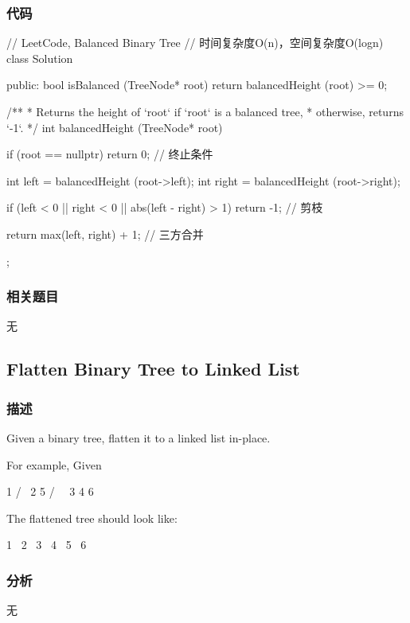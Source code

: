 \subsubsection{代码}
\begin{Code}
// LeetCode, Balanced Binary Tree
// 时间复杂度O(n)，空间复杂度O(logn)
class Solution {
public:
    bool isBalanced (TreeNode* root) {
        return balancedHeight (root) >= 0;
    }

    /**
     * Returns the height of `root` if `root` is a balanced tree,
     * otherwise, returns `-1`.
     */
    int balancedHeight (TreeNode* root) {
        if (root == nullptr) return 0;  // 终止条件

        int left = balancedHeight (root->left);
        int right = balancedHeight (root->right);

        if (left < 0 || right < 0 || abs(left - right) > 1) return -1;  // 剪枝

        return max(left, right) + 1; // 三方合并
    }
};
\end{Code}


\subsubsection{相关题目}
\begindot
\item 无
\myenddot


\subsection{Flatten Binary Tree to Linked List}
\label{sec:flatten-binary-tree-to-linked-list}


\subsubsection{描述}
Given a binary tree, flatten it to a linked list in-place.

For example, Given
\begin{Code}
         1
        / \
       2   5
      / \   \
     3   4   6
\end{Code}

The flattened tree should look like:
\begin{Code}
   1
    \
     2
      \
       3
        \
         4
          \
           5
            \
             6
\end{Code}

\subsubsection{分析}
无


